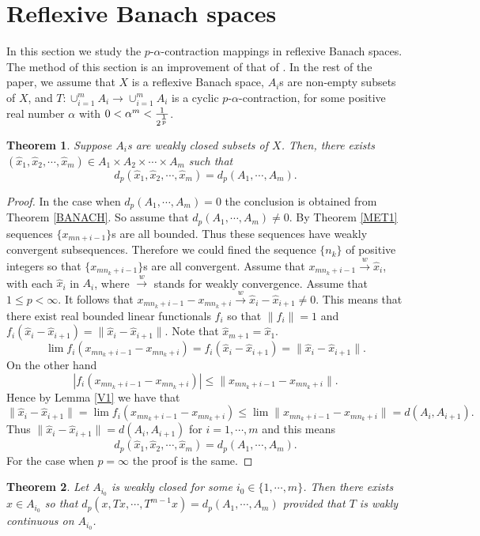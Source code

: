 \documentclass{amsart}
\newtheorem{theorem}{Theorem}[section]
\theoremstyle{definition}
\theoremstyle{remark}
\begin{document}
\section{Reflexive Banach spaces}
In this section we study the $p$-$\alpha$-contraction mappings in reflexive Banach spaces. The method of this section is an improvement of that of \cite[Section 3]{ThSh}. In the rest of the paper, we assume that $X$ is a reflexive Banach space, $A_i$s are non-empty subsets of $X$, and $T:\cup_{i=1}^mA_i\to\cup_{i=1}^mA_i$ is a cyclic $p$-$\alpha$-contraction, for some positive real number $\alpha$ with $0<\alpha^m<{1\over{2^{1\over p}}}$.
\begin{theorem}\label{REFL}
Suppose $A_i$s are weakly closed subsets of $X$. Then, there exists $(\hat{x}_1,\hat{x}_2,\cdots,\hat{x}_m)\in A_1\times A_2\times\cdots\times A_m$ such that
$$d_p(\hat{x}_1,\hat{x}_2,\cdots,\hat{x}_m)=d_p(A_1,\cdots,A_m).$$
\end{theorem}
\begin{proof}In the case when $d_p(A_1,\cdots,A_m)=0$ the conclusion is obtained from Theorem \ref{BANACH}. So assume that $d_p(A_1,\cdots,A_m)\neq0$. By Theorem \ref{MET1} sequences $\{x_{mn+i-1}\}$s are all bounded. Thus these sequences have weakly convergent subsequences. Therefore we could fined the sequence $\{n_k\}$ of positive integers so that $\{x_{mn_k+i-1}\}$s are all convergent. Assume that $x_{mn_k+i-1}\xrightarrow{w}\hat{x}_i$, with each $\hat{x}_i$ in $A_i$, where $\xrightarrow{w}$ stands for weakly convergence. Assume that $1\leq p<\infty$. It follows that $x_{mn_k+i-1}-x_{mn_k+i}\xrightarrow{w}\hat{x}_i-\hat{x}_{i+1}\neq0$. This means that there exist real bounded linear functionals $f_i$ so that $\|f_i\|=1$ and $f_i(\hat{x}_i-\hat{x}_{i+1})=\|\hat{x}_i-\hat{x}_{i+1}\|.$ Note that $\hat{x}_{m+1}=\hat{x}_{1}$. $$\lim f_i(x_{mn_k+i-1}-x_{mn_k+i})=f_i(\hat{x}_i-\hat{x}_{i+1})=\|\hat{x}_i-\hat{x}_{i+1}\|.$$ On the other hand $$|f_i(x_{mn_k+i-1}-x_{mn_k+i})|\leq \|x_{mn_k+i-1}-x_{mn_k+i}\|.$$ Hence by Lemma \ref{V1} we have that $$\|\hat{x}_i-\hat{x}_{i+1}\|=\lim f_i(x_{mn_k+i-1}-x_{mn_k+i})\leq \lim\|x_{mn_k+i-1}-x_{mn_k+i}\|=d(A_i,A_{i+1}).$$ Thus $\|\hat{x}_i-\hat{x}_{i+1}\|=d(A_i,A_{i+1})$ for $i=1,\cdots,m$ and this means $$d_p(\hat{x}_1,\hat{x}_2,\cdots,\hat{x}_m)=d_p(A_1,\cdots,A_m).$$ For the case when $p=\infty$ the proof is the same.
\end{proof}
\begin{theorem}\label{REFL3}
Let $A_{i_0}$ is weakly closed for some $i_0\in\{1,\cdots,m\}$. Then there exists $x\in A_{i_0}$ so that $d_p(x,Tx,\cdots,T^{m-1}x)=d_p(A_1,\cdots,A_m)$ provided that $T$ is wakly continuous on $A_{i_0}$.
\end{theorem}
\end{document}
